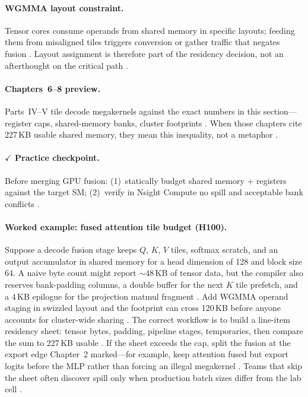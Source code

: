 \paragraph{WGMMA layout constraint.}
Tensor cores consume operands from shared memory in specific layouts; feeding them from misaligned tiles triggers conversion or gather traffic that negates fusion \citep{shah2024flashattention3,nvidia2022hopper}.
Layout assignment is therefore part of the residency decision, not an afterthought on the critical path \citep{chen2020compilerbasedhardw,yirage2026}.

\paragraph{Chapters~6--8 preview.}
Parts~IV--V tile decode megakernels against the exact numbers in this section---register caps, shared-memory banks, cluster footprints \citep{nvidia2022hopper,semianalysis2024tma}.
When those chapters cite 227\,KB usable shared memory, they mean this inequality, not a metaphor \citep{memoryfloor2026}.

\paragraph{$\checkmark$ Practice checkpoint.}
Before merging GPU fusion: (1)~statically budget shared memory + registers against the target SM; (2)~verify in Nsight Compute no spill and acceptable bank conflicts \citep{nvidia2022hopper,memoryfloor2026}.

\paragraph{Worked example: fused attention tile budget (H100).}
Suppose a decode fusion stage keeps $Q$, $K$, $V$ tiles, softmax scratch, and an output accumulator in shared memory for a head dimension of 128 and block size 64.
A naive byte count might report ${\sim}48$\,KB of tensor data, but the compiler also reserves bank-padding columns, a double buffer for the next $K$ tile prefetch, and a 4\,KB epilogue for the projection matmul fragment \citep{shah2024flashattention3,nvidia2022hopper}.
Add WGMMA operand staging in swizzled layout and the footprint can cross 120\,KB before anyone accounts for cluster-wide sharing \citep{semianalysis2024tma}.
The correct workflow is to build a line-item residency sheet: tensor bytes, padding, pipeline stages, temporaries, then compare the sum to 227\,KB usable \citep{memoryfloor2026,yirage2026}.
If the sheet exceeds the cap, split the fusion at the export edge Chapter~2 marked---for example, keep attention fused but export logits before the MLP rather than forcing an illegal megakernel \citep{chen2020compilerbasedhardw,taxbreak2026}.
Teams that skip the sheet often discover spill only when production batch sizes differ from the lab cell \citep{patel2025llminference}.

